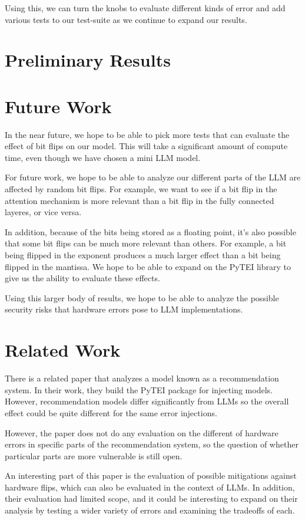 \documentclass[a4paper]{article}
\begin{document}
Using this, we can turn the knobs to evaluate different kinds of error and add various tests to our test-suite as we continue to expand our results.

\section{Preliminary Results}

\section{Future Work}

In the near future, we hope to be able to pick more tests that can evaluate the effect of bit flips on our model. This will take a significant amount of compute time, even though we have chosen a mini LLM model.

For future work, we hope to be able to analyze our different parts of the LLM are affected by random bit flips. For example, we want to see if a bit flip in the attention mechanism is more relevant than a bit flip in the fully connected layeres, or vice versa. 

In addition, because of the bits being stored as a floating point, it's also possible that some bit flips can be much more relevant than others. For example, a bit being flipped in the exponent produces a much larger effect than a bit being flipped in the mantissa. We hope to be able to expand on the PyTEI library to give us the ability to evaluate these effects.

Using this larger body of results, we hope to be able to analyze the possible security risks that hardware errors pose to LLM implementations.

\section{Related Work}
There is a related paper \cite{Ma23} that analyzes a model known as a recommendation system. In their work, they build the PyTEI package for injecting models. However, recommendation models differ significantly from LLMs so the overall effect could be quite different for the same error injections.

However, the paper does not do any evaluation on the different of hardware errors in specific parts of the recommendation system, so the question of whether particular parts are more vulnerable is still open.

An interesting part of this paper is the evaluation of possible mitigations against hardware flips, which can also be evaluated in the context of LLMs. In addition, their evaluation had limited scope, and it could be interesting to expand on their analysis by testing a wider variety of errors and examining the tradeoffs of each.
\end{document}
